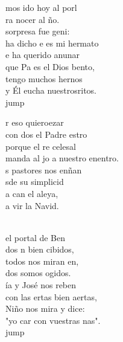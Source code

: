 \begin{cancion}%
	mos ido hoy al porl\\
	ra nocer al ño.\\
	 sorpresa fue geni:\\
	 ha dicho e es mi hermato\\
	e ha querido anunar\\
	que Pa es el Dios bento, \\
	 tengo muchos hernos\\
	y Él eucha nuestrosritos.\\jump\\
	\begin{chorus}%
	r eso quieroezar\\
	con dos el Padre estro\\
	porque el re celesal\\
	manda al jo a nuestro enentro.\\
	s pastores nos enñan\\
	sde su simplicid\\
	a can el aleya,\\
	a vir la Navid.\\
	\end{chorus}%
	\jump\\
	 el portal de Ben \\
	dos n bien cibidos,\\
	todos nos miran en,\\
	dos somos ogidos.  \\
	ía y José nos reben\\
	con las ertas bien aertas,\\
	Niño nos mira y dice:\\
	"yo car con vuestras nas".\\jump\\

\end{cancion}

